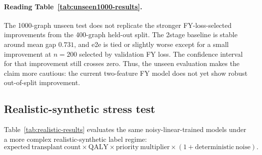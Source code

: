 \documentclass[11pt]{article}
\begin{document}
\paragraph{Reading Table~\ref{tab:unseen1000-results}.}
The 1000-graph unseen test does not replicate the stronger FY-loss-selected
improvements from the 400-graph held-out split. The 2stage baseline is stable
around mean gap \(0.731\), and e2e is tied or slightly worse except for a small
improvement at \(n=200\) selected by validation FY loss. The confidence interval
for that improvement still crosses zero. Thus, the unseen evaluation makes the
claim more cautious: the current two-feature FY model does not yet show robust
out-of-split improvement.

\subsection{Realistic-synthetic stress test}

Table~\ref{tab:realistic-results} evaluates the same noisy-linear-trained
models under a more complex realistic-synthetic label regime:
\[
    \mathrm{expected\ transplant\ count}
    \times
    \mathrm{QALY}
    \times
    \mathrm{priority\ multiplier}
    \times
    (1+\mathrm{deterministic\ noise}).
\]

\begin{table}[h]
\centering
\caption{Realistic-synthetic label-regime stress test.}
\label{tab:realistic-results}
\end{table}
\end{document}
